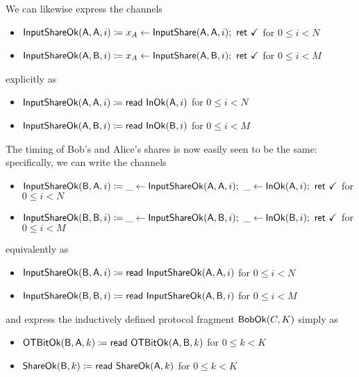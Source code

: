 \noindent We can likewise express the channels
\begin{itemize}
\item $\mathsf{InputShareOk}(\mathsf{A},\mathsf{A},i) \coloneqq x_A \leftarrow \mathsf{InputShare}(\mathsf{A},\mathsf{A},i); \ \mathsf{ret} \ \checkmark$ for $0 \leq i < N$
\item $\mathsf{InputShareOk}(\mathsf{A},\mathsf{B},i) \coloneqq x_A \leftarrow \mathsf{InputShare}(\mathsf{A},\mathsf{B},i); \ \mathsf{ret} \ \checkmark$ for $0 \leq i < M$
\end{itemize}
explicitly as
\begin{itemize}
\item $\mathsf{InputShareOk}(\mathsf{A},\mathsf{A},i) \coloneqq \mathsf{read} \ \mathsf{InOk}(\mathsf{A},i)$ for $0 \leq i < N$
\item $\mathsf{InputShareOk}(\mathsf{A},\mathsf{B},i) \coloneqq \mathsf{read} \ \mathsf{InOk}(\mathsf{B},i)$ for $0 \leq i < M$
\end{itemize}

\noindent The timing of Bob's and Alice's shares is now easily seen to be the same: specifically, we can write the channels
\begin{itemize}
\item $\InputShareOk(\B,\A,i) \coloneqq \_ \leftarrow \InputShareOk(\A,\A,i); \ \_ \leftarrow \InOk(\A,i); \ \ret{\checkmark}$ for $0 \leq i < N$
\item $\mathsf{InputShareOk}(\mathsf{B},\mathsf{B},i) \coloneqq \_ \leftarrow \mathsf{InputShareOk}(\mathsf{A},\mathsf{B},i); \ \_ \leftarrow \mathsf{InOk}(\mathsf{B},i); \  \mathsf{ret} \ \checkmark$ for $0 \leq i < M$
\end{itemize}
equivalently as
\begin{itemize}
\item $\mathsf{InputShareOk}(\mathsf{B},\mathsf{A},i) \coloneqq \mathsf{read} \ \mathsf{InputShareOk}(\mathsf{A},\mathsf{A},i)$ for $0 \leq i < N$
\item $\mathsf{InputShareOk}(\mathsf{B},\mathsf{B},i) \coloneqq \mathsf{read} \ \mathsf{InputShareOk}(\mathsf{A},\mathsf{B},i)$ for $0 \leq i < M$
\end{itemize}
and express the inductively defined protocol fragment $\mathsf{BobOk}(C,K)$ simply as
\begin{itemize}
\item $\mathsf{OTBitOk}(\mathsf{B},\mathsf{A},k) \coloneqq \mathsf{read} \ \mathsf{OTBitOk}(\mathsf{A},\mathsf{B},k)$ for $0 \leq k < K$
\item $\mathsf{ShareOk}(\mathsf{B},k) \coloneqq \mathsf{read} \ \mathsf{ShareOk}(\mathsf{A},k)$ for $0 \leq k < K$
\end{itemize}

